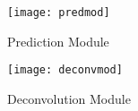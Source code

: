 \documentclass{article}
\begin{document}
\begin{figure}
    \centering
    \texttt{[image: predmod]}
    \caption{Prediction Module \cite{dssdcite}}
    \label{fig:predmod1}
\end{figure}

\begin{figure}
    \centering
    \texttt{[image: deconvmod]}
    \caption{Deconvolution Module \cite{dssdcite}}
    \label{fig:deconvmod1}
\end{figure}
\end{document}
